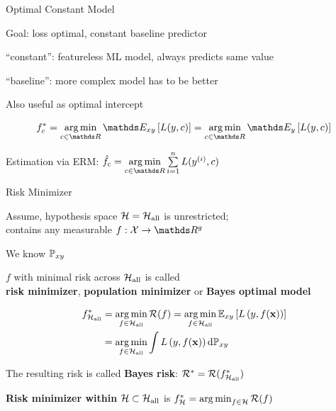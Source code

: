 \documentclass[11pt,compress,t,notes=noshow, xcolor=table]{beamer}
\begin{document}
\begin{framei}[sep=M]{Optimal Constant Model}

\item Goal: loss optimal, constant baseline predictor
\item ``constant'': featureless ML model, always predicts same value
\item ``baseline'': more complex model has to be better 
\item Also useful as optimal intercept


$$f_{c}^{\ast} = \argmin_{c \in \R} \E_{xy} \left[L(y,c)\right] = \argmin_{c \in \R} \E_{y} \left[L(y,c)\right]$$

\item Estimation via ERM: $\hat{f}_c = \argminlim_{c \in \R} \sumin L(\yi,c)$



\end{framei}


\begin{framei}[sep=M]{Risk Minimizer}

\item Assume, hypothesis space $\mathcal{H}=\mathcal{H}_{\text{all}}$ is unrestricted;\\
contains any measurable $f: \Xspace \to \R^g$

\item We know $\mathbb{P}_{xy}$

\item $f$ with minimal risk across $\mathcal{H}_{\text{all}}$
is called\\
\textbf{risk minimizer}, \textbf{population minimizer} or \textbf{Bayes optimal model}

\begin{align*}
f^{\ast}_{\mathcal{H}_{\text{all}}} &= \operatorname*{arg\,min}_{f \in \mathcal{H}_{\text{all}}} \mathcal{R}(f) = \operatorname*{arg\,min}_{f \in \mathcal{H}_{\text{all}}}\mathbb{E}_{xy}\left[L\left(y, f(\mathbf{x})\right)\right]\\ 
&=  \operatorname*{arg\,min}_{f \in \mathcal{H}_{\text{all}}}\int L\left(y, f(\mathbf{x})\right) \text{d}\mathbb{P}_{xy}
\end{align*}

\item The resulting risk is called \textbf{Bayes risk}:  $\mathcal{R}^\ast_{} = \mathcal{R}(f^{\ast}_{\mathcal{H}_{\text{all}}})$

\item \textbf{Risk minimizer within} $\mathcal{H} \subset \mathcal{H}_{\text{all}}$ is
$f^{\ast}_{\mathcal{H}} = \operatorname*{arg\,min}_{f \in \mathcal{H}} \mathcal{R}(f)$

\end{framei}

\end{document}
